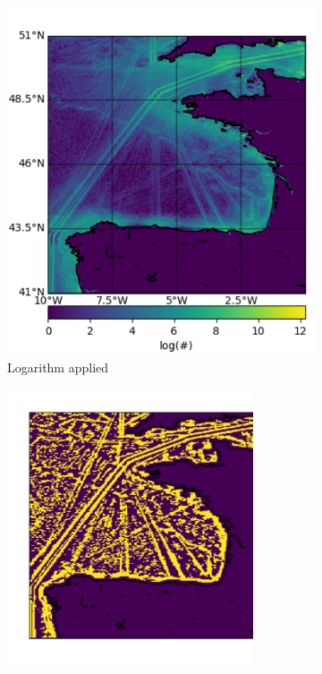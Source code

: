 \documentclass{article}
\begin{document}
\begin{figure}[ht] 
  \begin{subfigure}[b]{0.5\linewidth}
    \centering
    \includegraphics[width=0.8\linewidth]{CELTICcrop.pdf} 
    \caption{Logarithm applied} 
    \label{fig7:a} 
    \vspace{4ex}
  \end{subfigure}%
  \begin{subfigure}[b]{0.5\linewidth}
    \centering
    \includegraphics[width=0.8\textwidth]{CELTICopened-crop.pdf} 

\end{subfigure}
\end{figure}
\end{document}
